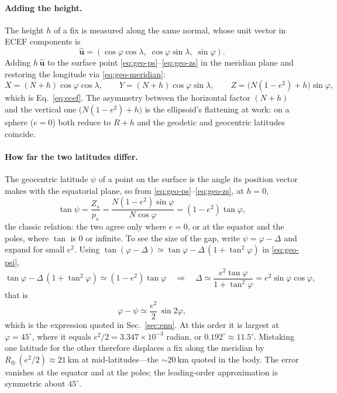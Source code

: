 \begin{revblock}
\paragraph{Adding the height.}
The height $h$ of a fix is measured along the same normal, whose unit vector in ECEF
components is
\begin{equation}
\label{eq:geo-up}
\hat{\mathbf{u}}=(\cos\varphi\cos\lambda,\;\cos\varphi\sin\lambda,\;\sin\varphi).
\end{equation}
Adding $h\,\hat{\mathbf{u}}$ to the surface point
\eqref{eq:geo-ps}--\eqref{eq:geo-zs} in the meridian plane and restoring the longitude via
\eqref{eq:geo-meridian}:
\begin{equation}
X=(N+h)\cos\varphi\cos\lambda,\qquad
Y=(N+h)\cos\varphi\sin\lambda,\qquad
Z=\big(N(1-e^2)+h\big)\sin\varphi,
\end{equation}
which is Eq.~\eqref{eq:ecef}. The asymmetry between the horizontal factor $(N+h)$ and the
vertical one $\big(N(1-e^2)+h\big)$ is the ellipsoid's flattening at work: on a sphere
($e=0$) both reduce to $R+h$ and the geodetic and geocentric latitudes coincide.

\begin{revblock}
\paragraph{How far the two latitudes differ.}
The geocentric latitude $\psi$ of a point on the surface is the angle its position vector
makes with the equatorial plane, so from \eqref{eq:geo-ps}--\eqref{eq:geo-zs}, at $h=0$,
\begin{equation}
\label{eq:geo-psi}
  \tan\psi=\frac{Z_s}{p_s}=\frac{N(1-e^2)\sin\varphi}{N\cos\varphi}=(1-e^2)\tan\varphi ,
\end{equation}
the classic relation: the two agree only where $e=0$, or at the equator and the poles,
where $\tan$ is $0$ or infinite. To see the size of the gap, write $\psi=\varphi-\Delta$
and expand for small $e^2$. Using
$\tan(\varphi-\Delta)\simeq\tan\varphi-\Delta\,(1+\tan^2\varphi)$ in \eqref{eq:geo-psi},
\begin{equation}
  \tan\varphi-\Delta\,(1+\tan^2\varphi)\simeq(1-e^2)\tan\varphi
  \quad\Longrightarrow\quad
  \Delta\simeq\frac{e^2\tan\varphi}{1+\tan^2\varphi}=e^2\sin\varphi\cos\varphi ,
\end{equation}
that is
\begin{equation}
\label{eq:geo-latgap}
  \varphi-\psi\simeq\frac{e^2}{2}\,\sin 2\varphi ,
\end{equation}
which is the expression quoted in Sec.~\ref{sec:enu}. At this order it is largest
at $\varphi=45^\circ$, where it equals $e^2/2=3.347\times10^{-3}$ radian, or
$0.192^\circ\approx11.5'$. Mistaking one latitude for the other therefore displaces a fix
along the meridian by $R_\oplus\,(e^2/2)\approx\SI{21}{\kilo\metre}$ at mid-latitudes---the
${\sim}\SI{20}{\kilo\metre}$ quoted in the body. The error vanishes at the equator and at
the poles; the leading-order approximation is symmetric about $45^\circ$.
\end{revblock}


\end{revblock}
